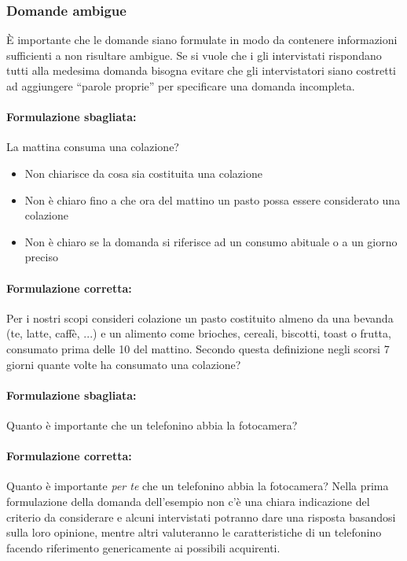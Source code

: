 \subsubsection{Domande ambigue}
È importante che le domande siano formulate in modo da contenere informazioni sufficienti a non risultare ambigue. Se si vuole che i gli intervistati rispondano tutti alla medesima domanda bisogna evitare che gli intervistatori siano costretti ad aggiungere “parole proprie” per specificare una domanda incompleta.
\paragraph{Formulazione sbagliata:} La mattina consuma una colazione? \newline
\begin{itemize}
	\item Non chiarisce da cosa sia costituita una colazione
	\item Non è chiaro fino a che ora del mattino un pasto possa essere considerato una colazione
	\item Non è chiaro se la domanda si riferisce ad un consumo abituale o a un giorno preciso
\end{itemize}

\paragraph{Formulazione corretta:} Per i nostri scopi consideri colazione un pasto costituito almeno da una bevanda (te, latte, caffè, ...) e un alimento come brioches, cereali, biscotti, toast o frutta, consumato prima delle 10 del mattino. Secondo questa definizione negli scorsi 7 giorni quante volte ha consumato una colazione?

\paragraph{Formulazione sbagliata:} Quanto è importante che un telefonino abbia la
fotocamera?

\paragraph{Formulazione corretta:} Quanto è importante \textit{per te} che un telefonino abbia la fotocamera?
Nella prima formulazione della domanda dell'esempio non c'è una chiara indicazione del criterio da considerare e alcuni intervistati potranno dare una risposta basandosi sulla loro opinione, mentre altri valuteranno le caratteristiche di un telefonino facendo riferimento genericamente ai possibili acquirenti.

